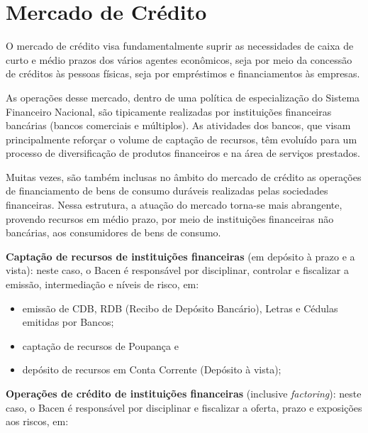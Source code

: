\documentclass{article}\usepackage[]{graphicx}\usepackage[]{xcolor}
\begin{document}
\section*{Mercado de Crédito}

O mercado de crédito visa fundamentalmente suprir as necessidades de caixa de curto e médio prazos 
dos vários agentes econômicos, seja por meio da concessão de créditos às pessoas físicas, seja por 
empréstimos e financiamentos às empresas.\par

As operações desse mercado, dentro de uma política de especialização do Sistema Financeiro Nacional, 
são tipicamente realizadas por instituições financeiras bancárias (bancos comerciais e múltiplos). 
As atividades dos bancos, que visam principalmente reforçar o volume de captação de recursos, têm 
evoluído para um processo de diversificação de produtos financeiros e na área de serviços prestados.\par

Muitas vezes, são também inclusas no âmbito do mercado de crédito as operações de financiamento de 
bens de consumo duráveis realizadas pelas sociedades financeiras. Nessa estrutura, a atuação do 
mercado torna-se mais abrangente, provendo recursos em médio prazo, por meio de instituições 
financeiras não bancárias, aos consumidores de bens de consumo.\par

\textbf{Captação de recursos de instituições financeiras} (em depósito à prazo e a vista): neste caso, o 
Bacen é responsável por disciplinar, controlar e fiscalizar a emissão, intermediação e níveis de 
risco, em:

\begin{itemize}
  
  \item emissão de CDB, RDB (Recibo de Depósito Bancário), Letras e Cédulas emitidas por Bancos;
  
  \item captação de recursos de Poupança e
  
  \item depósito de recursos em Conta Corrente (Depósito à vista);
  
\end{itemize}

\textbf{Operações de crédito de instituições financeiras} (inclusive \textit{factoring}): neste caso, o Bacen 
é responsável por disciplinar e fiscalizar a oferta, prazo e exposições aos riscos, em:
\end{document}
